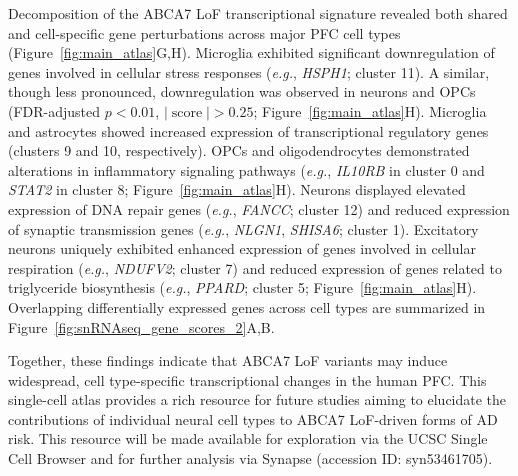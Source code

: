 \documentclass[12pt]{article}
\begin{document}
Decomposition of the ABCA7 LoF transcriptional signature revealed both shared and cell-specific gene perturbations across major PFC cell types (Figure~\ref{fig:main_atlas}G,H). Microglia exhibited significant downregulation of genes involved in cellular stress responses (\textit{e.g.}, \textit{HSPH1}; cluster 11). A similar, though less pronounced, downregulation was observed in neurons and OPCs (FDR-adjusted $p<0.01$, $|\operatorname{score}|>0.25$; Figure~\ref{fig:main_atlas}H). Microglia and astrocytes showed increased expression of transcriptional regulatory genes (clusters 9 and 10, respectively). OPCs and oligodendrocytes demonstrated alterations in inflammatory signaling pathways (\textit{e.g.}, \textit{IL10RB} in cluster 0 and \textit{STAT2} in cluster 8; Figure~\ref{fig:main_atlas}H). Neurons displayed elevated expression of DNA repair genes (\textit{e.g.}, \textit{FANCC}; cluster 12) and reduced expression of synaptic transmission genes (\textit{e.g.}, \textit{NLGN1}, \textit{SHISA6}; cluster 1). Excitatory neurons uniquely exhibited enhanced expression of genes involved in cellular respiration (\textit{e.g.}, \textit{NDUFV2}; cluster 7) and reduced expression of genes related to triglyceride biosynthesis (\textit{e.g.}, \textit{PPARD}; cluster 5; Figure~\ref{fig:main_atlas}H). Overlapping differentially expressed genes across cell types are summarized in Figure~\ref{fig:snRNAseq_gene_scores_2}A,B.

Together, these findings indicate that ABCA7 LoF variants may induce widespread, cell type-specific transcriptional changes in the human PFC. This single-cell atlas provides a rich resource for future studies aiming to elucidate the contributions of individual neural cell types to ABCA7 LoF-driven forms of AD risk. This resource will be made available for exploration via the UCSC Single Cell Browser and for further analysis via Synapse (accession ID: syn53461705).
\end{document}
